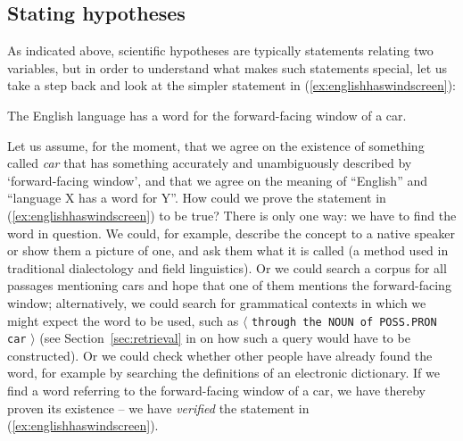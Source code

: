 \subsection{Stating hypotheses}\label{sec:statinghypotheses}\largerpage[-1]

As indicated above, scientific hypotheses are typically statements relating two variables, but in order to understand what makes such statements special, let us take a step back and look at the simpler statement in (\ref{ex:englishhaswindscreen}):

\begin{exe}
\ex The English language has a word for the forward\hyp{}facing window of a car.
\label{ex:englishhaswindscreen}
\end{exe}

Let us assume, for the moment, that we agree on the existence of something called \textit{car} that has something accurately and unambiguously described by `forward\hyp{}facing window', and that we agree on the meaning  of ``English'' and ``language X has a word for Y''. How could we prove the statement in (\ref{ex:englishhaswindscreen}) to be true? There is only one way: we have to find the word in question. We could, for example, describe the concept  to a native speaker or show them a picture of one, and ask them what it is called (a method used in traditional dialectology and field linguistics). Or we could search a corpus for all passages mentioning cars and hope that one of them mentions the forward\hyp{}facing window; alternatively, we could search for grammatical contexts in which we might expect the word to be used, such as $\langle$ \texttt{through the NOUN of POSS.PRON car} $\rangle$ (see Section~\ref{sec:retrieval} in  on how such a query  would have to be constructed). Or we could check whether other people have already found the word, for example by searching the definitions of an electronic dictionary.  If we find a word referring to the forward\hyp{}facing window of a car, we have thereby proven its existence -- we have \emph{verified} the statement in (\ref{ex:englishhaswindscreen}).\largerpage[-1]

